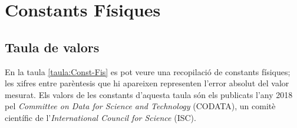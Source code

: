 \chapter{Constants Físiques}\label{sec:const_fis} 

\section{Taula de valors}

En la taula \vref{taula:Const-Fis} es pot veure una recopilació de
constants físiques; les xifres entre parèntesis que hi apareixen representen l'error absolut del valor mesurat. Els valors de les constants d'aquesta taula són els publicats
l'any 2018 pel \textit{Committee on Data for Science and Technology}
(CODATA), un comitè científic de l'\textit{International Council
for Science} (ISC). 


